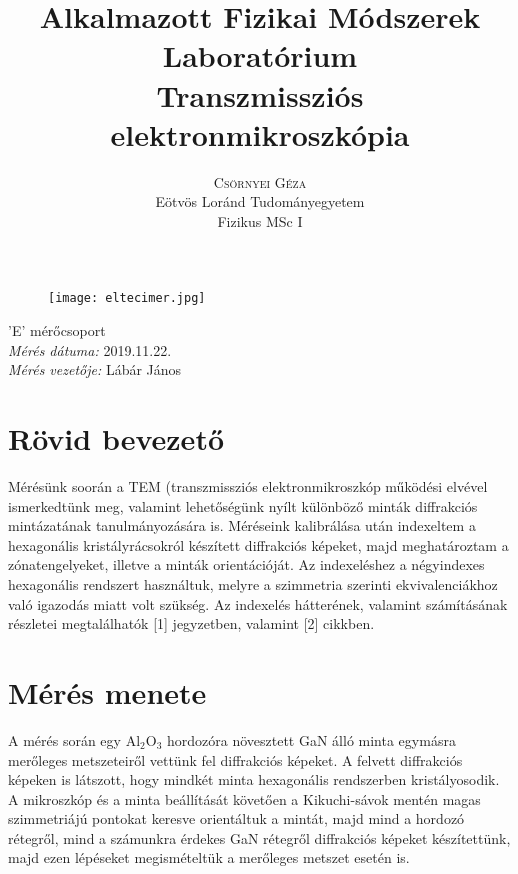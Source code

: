 \documentclass[12pt,a4paper]{article}
\title{\huge{Alkalmazott Fizikai Módszerek Laboratórium}\\ \vspace{20pt}
\textbf{Transzmissziós elektronmikroszkópia}}
\author{\Large{\textsc{Csörnyei Géza}} \vspace{10pt}\\
	\textrm{Eötvös Loránd Tudományegyetem}\\
	\textrm{Fizikus MSc I}
	}
\date{}
\begin{document}
\addtolength{\voffset}{-1.0cm}
\addtolength{\textheight}{1.0cm}
\begin{titlepage}
\maketitle

\begin{figure}[!htb]
\centering
\texttt{[image: eltecimer.jpg]}
\end{figure}

\hfil \Large{'E' mérőcsoport}\hfil  \\
\vspace*{2pt}
\hfil \Large{\emph{Mérés dátuma:} 2019.11.22.}\hfil \\
\vspace*{2pt}
\hfil \hspace*{45pt} \Large{\emph{Mérés vezetője:} Lábár János}\hfil
\thispagestyle{empty}
\end{titlepage}

\section{Rövid bevezető}
\hspace*{10pt} Mérésünk soorán a TEM (transzmissziós elektronmikroszkóp működési elvével ismerkedtünk meg, valamint lehetőségünk nyílt különböző minták diffrakciós mintázatának tanulmányozására is. Méréseink kalibrálása után indexeltem a hexagonális kristályrácsokról készített diffrakciós képeket, majd meghatároztam a zónatengelyeket, illetve a minták orientációját. Az indexeléshez a négyindexes hexagonális rendszert használtuk, melyre a szimmetria szerinti ekvivalenciákhoz való igazodás miatt volt szükség. Az indexelés hátterének, valamint számításának részletei megtalálhatók [1] jegyzetben, valamint [2] cikkben.

\section{Mérés menete}
\hspace*{10pt} A mérés során egy Al$_2$O$_3$ hordozóra növesztett GaN álló minta egymásra merőleges metszeteiről vettünk fel diffrakciós képeket. A felvett diffrakciós képeken is látszott, hogy mindkét minta hexagonális rendszerben kristályosodik. A mikroszkóp és a minta beállítását követően a Kikuchi-sávok mentén magas szimmetriájú pontokat keresve orientáltuk a mintát, majd mind a hordozó rétegről, mind a számunkra érdekes GaN rétegről diffrakciós képeket készítettünk, majd ezen lépéseket megismételtük a merőleges metszet esetén is.
\end{document}
